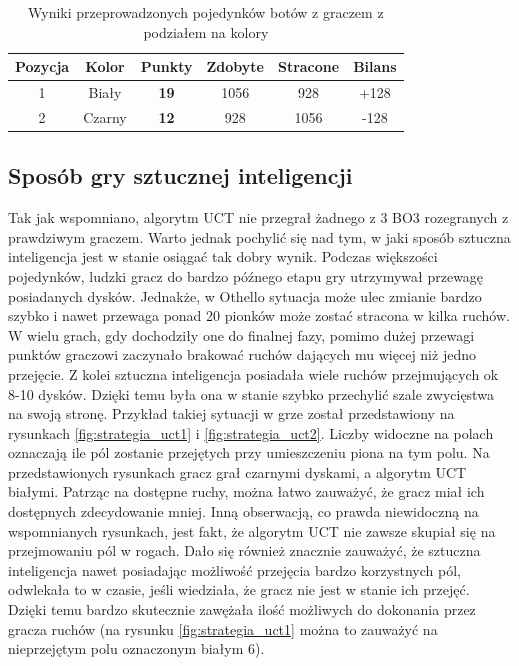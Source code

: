 \documentclass[10pt]{article}
\begin{document}
\begin{table}[H]
\centering
\begin{tabularx}{0.55\textwidth}{c|c|c|c|c|c}
\hline
Pozycja & Kolor & Punkty & Zdobyte & Stracone & Bilans \\
\hline \hline
1 & Biały & \textbf{19} & 1056 & 928 & +128 \\
2 & Czarny & \textbf{12} & 928 & 1056 & -128 \\
\hline
\end{tabularx}
\caption{Wyniki przeprowadzonych pojedynków botów z graczem z podziałem na kolory}
\label{tab:test_user_color}
\end{table}
\subsection{Sposób gry sztucznej inteligencji}
Tak jak wspomniano, algorytm UCT nie przegrał żadnego z 3 BO3 rozegranych z prawdziwym graczem. Warto jednak pochylić się nad tym, w jaki sposób sztuczna inteligencja jest w stanie osiągać tak dobry wynik. Podczas większości pojedynków, ludzki gracz do bardzo późnego etapu gry utrzymywał przewagę posiadanych dysków. Jednakże, w Othello sytuacja może ulec zmianie bardzo szybko i nawet przewaga ponad 20 pionków może zostać stracona w kilka ruchów. W wielu grach, gdy dochodziły one do finalnej fazy, pomimo dużej przewagi punktów graczowi zaczynało brakować ruchów dających mu więcej niż jedno przejęcie. Z kolei sztuczna inteligencja posiadała wiele ruchów przejmujących ok 8-10 dysków. Dzięki temu była ona w stanie szybko przechylić szale zwycięstwa na swoją stronę. Przykład takiej sytuacji w grze został przedstawiony na  rysunkach \ref{fig:strategia_uct1} i \ref{fig:strategia_uct2}. Liczby widoczne na polach oznaczają ile pól zostanie przejętych przy umieszczeniu piona na tym polu. Na przedstawionych rysunkach gracz grał czarnymi dyskami, a algorytm UCT białymi. Patrząc na dostępne ruchy, można łatwo zauważyć, że gracz miał ich dostępnych zdecydowanie mniej. Inną obserwacją, co prawda niewidoczną na wspomnianych rysunkach, jest fakt, że algorytm UCT nie zawsze skupiał się na przejmowaniu pól w rogach. Dało się również znacznie zauważyć, że sztuczna inteligencja nawet posiadając możliwość przejęcia bardzo korzystnych pól, odwlekała to w czasie, jeśli wiedziała, że gracz nie jest w stanie ich przejęć. Dzięki temu bardzo skutecznie zawężała ilość możliwych do dokonania przez gracza ruchów (na rysunku \ref{fig:strategia_uct1} można to zauważyć na nieprzejętym polu oznaczonym białym 6).
\end{document}
